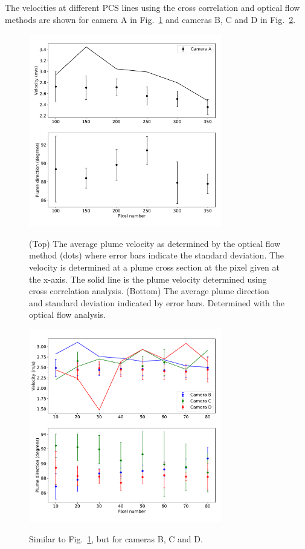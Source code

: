 \documentclass[amtd, manuscript]{copernicus}
\begin{document}
The velocities  at different PCS lines using the cross correlation and
optical flow methods are shown for camera A in
Fig.~\ref{fig:Fig_Velo_LocA} and cameras B, C and D in
Fig.~\ref{fig:Fig_Velo_LocV}.
%
\begin{figure}[!htb]
  \begin{center}
    \includegraphics[width=0.75\textwidth]{Fig_Velo_LocA.pdf}\\
    \caption{\label{fig:Fig_Velo_LocA}
      (Top) The average plume velocity as determined by the optical
      flow method (dots) where error bars indicate the standard
      deviation. The velocity is determined at a plume cross section
      at the pixel given at the x-axis. The solid line is the plume
      velocity determined using cross correlation analysis.
      (Bottom) The average plume direction and standard deviation
      indicated by error bars. Determined with the optical flow analysis.
    }
  \end{center}
\end{figure}
\begin{figure}[!htb]
  \begin{center}
    \includegraphics[width=0.75\textwidth]{Fig_Velo_LocV.pdf}\\
    \caption{\label{fig:Fig_Velo_LocV}
      Similar to Fig.~\ref{fig:Fig_Velo_LocA}, but for cameras B,
      C and D.
    }
  \end{center}
\end{figure}
\end{document}
